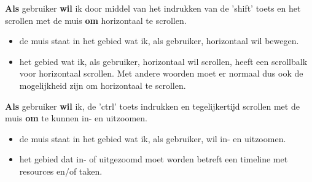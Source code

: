 \nextUserStory
\textbf{Als} gebruiker \textbf{wil} ik door middel van het indrukken van de 'shift' toets en het scrollen met de muis \textbf{om} horizontaal te scrollen. 
\begin{itemize} [label=\emph{ - Gegeven}, itemindent=2.5em, labelsep=0.3em]
    \item de muis staat in het gebied wat ik, als gebruiker, horizontaal wil bewegen.
    \item het gebied wat ik, als gebruiker, horizontaal wil scrollen, heeft een scrollbalk voor horizontaal scrollen. Met andere woorden moet er normaal dus ook de mogelijkheid zijn om horizontaal te scrollen.
\end{itemize}

\nextUserStory
\textbf{Als} gebruiker \textbf{wil} ik, de 'ctrl' toets indrukken en tegelijkertijd scrollen met de muis \textbf{om} te kunnen in- en uitzoomen. 
\begin{itemize} [label=\emph{ - Gegeven}, itemindent=2.5em, labelsep=0.3em]
    \item de muis staat in het gebied wat ik, als gebruiker, wil in- en uitzoomen. 
    \item het gebied dat in- of uitgezoomd moet worden betreft een timeline met resources en/of taken.
\end{itemize}

